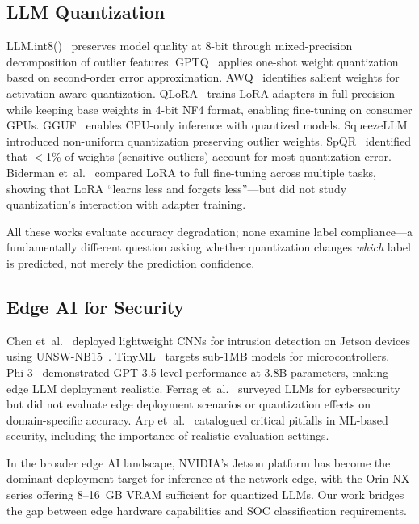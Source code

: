 \documentclass[journal]{IEEEtran}
\begin{document}
\subsection{LLM Quantization}
LLM.int8()~\cite{dettmers2022} preserves model quality at 8-bit through mixed-precision decomposition of outlier features. GPTQ~\cite{frantar2023} applies one-shot weight quantization based on second-order error approximation. AWQ~\cite{lin2024} identifies salient weights for activation-aware quantization. QLoRA~\cite{dettmers2023} trains LoRA adapters in full precision while keeping base weights in 4-bit NF4 format, enabling fine-tuning on consumer GPUs. GGUF~\cite{gguf2023} enables CPU-only inference with quantized models. SqueezeLLM~\cite{kim2024} introduced non-uniform quantization preserving outlier weights. SpQR~\cite{dettmers2024spqr} identified that $<$1\% of weights (sensitive outliers) account for most quantization error. Biderman et~al.~\cite{biderman2024} compared LoRA to full fine-tuning across multiple tasks, showing that LoRA ``learns less and forgets less''---but did not study quantization's interaction with adapter training.

All these works evaluate accuracy degradation; none examine label compliance---a fundamentally different question asking whether quantization changes \emph{which} label is predicted, not merely the prediction confidence.

\subsection{Edge AI for Security}
Chen et~al.~\cite{chen2023edge} deployed lightweight CNNs for intrusion detection on Jetson devices using UNSW-NB15~\cite{moustafa2016}. TinyML~\cite{banbury2021} targets sub-1MB models for microcontrollers. Phi-3~\cite{abdin2024} demonstrated GPT-3.5-level performance at 3.8B parameters, making edge LLM deployment realistic. Ferrag et~al.~\cite{ferrag2024} surveyed LLMs for cybersecurity but did not evaluate edge deployment scenarios or quantization effects on domain-specific accuracy. Arp et~al.~\cite{arp2022} catalogued critical pitfalls in ML-based security, including the importance of realistic evaluation settings.

In the broader edge AI landscape, NVIDIA's Jetson platform has become the dominant deployment target for inference at the network edge, with the Orin NX series offering 8--16~GB VRAM sufficient for quantized LLMs. Our work bridges the gap between edge hardware capabilities and SOC classification requirements.
\end{document}
